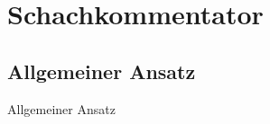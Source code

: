 \section{Schachkommentator}

\subsection{Allgemeiner Ansatz}

\begin{frame}{Allgemeiner Ansatz}

\end{frame}
